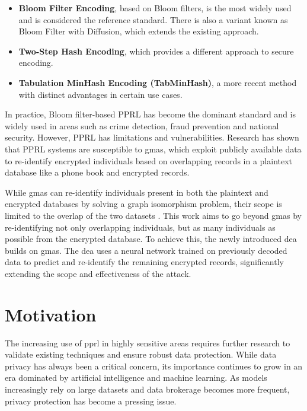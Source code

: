 \begin{itemize}
    \item \textbf{Bloom Filter Encoding},  based on Bloom filters, is the most widely used and is considered the reference standard.
    There is also a variant known as Bloom Filter with Diffusion, which extends the existing approach.
    \item \textbf{Two-Step Hash Encoding}, which provides a different approach to secure encoding.
    \item \textbf{Tabulation MinHash Encoding (TabMinHash)}, a more recent method with distinct advantages in certain use cases.
\end{itemize}

In practice, Bloom filter-based PPRL has become the dominant standard and is widely used in areas such as crime detection, fraud prevention and national security.
However, PPRL has limitations and vulnerabilities.
Research has shown that PPRL systems are susceptible to \ac{gma}s, which exploit publicly available data to re-identify encrypted individuals based on overlapping records in a plaintext database like a phone book and encrypted records. \cite{pathak2024, schaefer2024}

While \ac{gma}s can re-identify individuals present in both the plaintext and encrypted databases by solving a graph isomorphism problem, their scope is limited to the overlap of the two datasets \cite{schaefer2024}.
This work aims to go beyond \ac{gma}s by re-identifying not only overlapping individuals, but as many individuals as possible from the encrypted database.
To achieve this, the newly introduced \ac{dea} builds on \ac{gma}s.
The \ac{dea} uses a neural network trained on previously decoded data to predict and re-identify the remaining encrypted records, significantly extending the scope and effectiveness of the attack. 


\section{Motivation}  \label{sec:motivation}
The increasing use of \ac{pprl} in highly sensitive areas requires further research to validate existing techniques and ensure robust data protection.
While data privacy has always been a critical concern, its importance continues to grow in an era dominated by artificial intelligence and machine learning.
As models increasingly rely on large datasets and data brokerage becomes more frequent, privacy protection has become a pressing issue.

